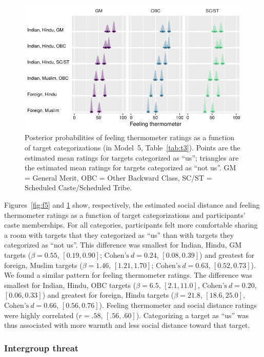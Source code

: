 \documentclass[12pt, a4paper]{article}
\begin{document}
\begin{figure}
\centering
\includegraphics[scale=1]{../figures/figure-6}
\caption{
Posterior probabilities of feeling thermometer ratings as a function of target categorizations (in Model~5, Table~\ref{tab:t3}). Points are the estimated mean ratings for targets categorized as ``us''; triangles are the estimated mean ratings for targets categorized as ``not us''. GM = General Merit, OBC = Other Backward Class, SC/ST = Scheduled Caste/Scheduled Tribe.
}
\label{fig:f6}
\end{figure}

Figures~\ref{fig:f5} and \ref{fig:f6} show, respectively, the estimated social distance and feeling thermometer ratings as a function of target categorizations and participants' caste memberships. For all categories, participants felt more comfortable sharing a room with targets that they categorized as ``us'' than with targets they categorized as ``not us''. This difference was smallest for Indian, Hindu, GM targets ($\beta = 0.55$, $[0.19, 0.90]$; $\text{Cohen's}~d = 0.24$, $[0.08, 0.39]$) and greatest for foreign, Muslim targets ($\beta = 1.46$, $[1.21, 1.70]$; $\text{Cohen's}~d = 0.63$, $[0.52, 0.73]$). We found a similar pattern for feeling thermometer ratings. The difference was smallest for Indian, Hindu, OBC targets ($\beta = 6.5$, $[2.1, 11.0]$, $\text{Cohen's}~d = 0.20$, $[0.06, 0.33]$) and greatest for foreign, Hindu targets ($\beta = 21.8$, $[18.6, 25.0]$, $\text{Cohen's}~d = 0.66$, $[0.56, 0.76]$). Feeling thermometer and social distance ratings were highly correlated ($r = .58$, $[.56, .60]$). Categorizing a target as ``us'' was thus associated with more warmth and less social distance toward that target.

\subsubsection{Intergroup threat}
\end{document}
